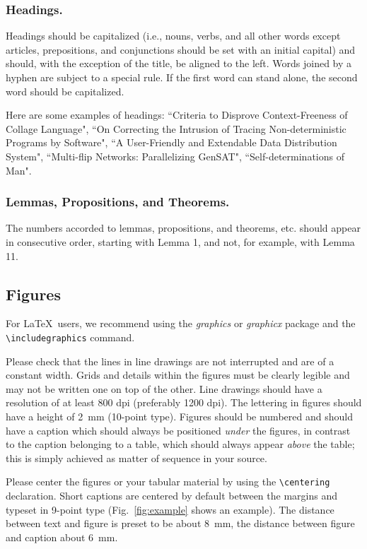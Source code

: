 \documentclass[runningheads]{llncs}
\begin{document}
{\subsubsection{Headings.}

Headings should be capitalized
(i.e., nouns, verbs, and all other words
except articles, prepositions, and conjunctions should be set with an
initial capital) and should,
with the exception of the title, be aligned to the left.
Words joined by a hyphen are subject to a special rule. If the first
word can stand alone, the second word should be capitalized.

Here are some examples of headings: ``Criteria to Disprove
Context-Freeness of Collage Language", ``On Correcting the Intrusion of
Tracing Non-deterministic Programs by Software", ``A User-Friendly and
Extendable Data Distribution System", ``Multi-flip Networks:
Parallelizing GenSAT", ``Self-determinations of Man".

\subsubsection{Lemmas, Propositions, and Theorems.}

The numbers accorded to lemmas, propositions, and theorems, etc. should
appear in consecutive order, starting with Lemma 1, and not, for
example, with Lemma 11.

\subsection{Figures}

For \LaTeX\ users, we recommend using the \emph{graphics} or \emph{graphicx}
package and the \verb+\includegraphics+ command.

Please check that the lines in line drawings are not
interrupted and are of a constant width. Grids and details within the
figures must be clearly legible and may not be written one on top of
the other. Line drawings should have a resolution of at least 800 dpi
(preferably 1200 dpi). The lettering in figures should have a height of
2~mm (10-point type). Figures should be numbered and should have a
caption which should always be positioned \emph{under} the figures, in
contrast to the caption belonging to a table, which should always appear
\emph{above} the table; this is simply achieved as matter of sequence in
your source.

Please center the figures or your tabular material by using the \verb+\centering+
declaration. Short captions are centered by default between the margins
and typeset in 9-point type (Fig.~\ref{fig:example} shows an example).
The distance between text and figure is preset to be about 8~mm, the
distance between figure and caption about 6~mm.

}
\end{document}
